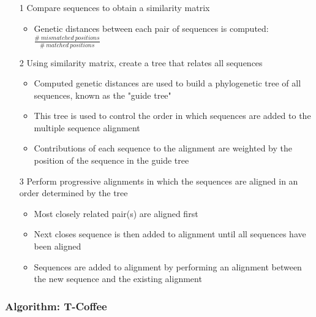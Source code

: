 \documentclass[a4paper]{article}
\begin{document}
\begin{enumerate}
  \item[1]
    Compare sequences to obtain a similarity matrix

    \begin{itemize}
      \item
        Genetic distances between each pair of sequences is computed:
        $\frac{\# \: mismatched \: positions}{\# \: matched \: positions}$
    \end{itemize}

  \item[2]
    Using similarity matrix, create a tree that relates all sequences

    \begin{itemize}
      \item
        Computed genetic distances are used to build a phylogenetic tree of all
        sequences, known as the "guide tree"

      \item
        This tree is used to control the order in which sequences are added to
        the multiple sequence alignment

      \item
        Contributions of each sequence to the alignment are weighted by the
        position of the sequence in the guide tree
    \end{itemize}

  \item[3]
    Perform progressive alignments in which the sequences are aligned in an
    order determined by the tree

    \begin{itemize}
      \item
        Most closely related pair(s) are aligned first

      \item
        Next closes sequence is then added to alignment until all sequences have
        been aligned

      \item
        Sequences are added to alignment by performing an alignment between the
        new sequence and the existing alignment
    \end{itemize}
\end{enumerate}

\subsubsection{Algorithm: T-Coffee}
\end{document}
